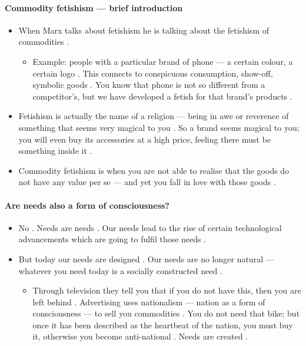 \paragraph{Commodity fetishism --- brief introduction}
\begin{itemize}
    \item When Marx talks about fetishism he is talking about the fetishism of commodities .
    \begin{itemize}
        \item Example: people with a particular brand of phone --- a certain colour, a certain logo . This connects to conspicuous consumption, show-off, symbolic goods . You know that phone is not so different from a competitor's, but we have developed a fetish for that brand's products .
    \end{itemize}
    \item Fetishism is actually the name of a religion --- being in awe or reverence of something that seems very magical to you . So a brand seems magical to you; you will even buy its accessories at a high price, feeling there must be something inside it .
    \item Commodity fetishism is when you are not able to realise that the goods do not have any value per se --- and yet you fall in love with those goods .
\end{itemize}

\paragraph{Are needs also a form of consciousness?}
\begin{itemize}
    \item No . Needs are needs . Our needs lead to the rise of certain technological advancements which are going to fulfil those needs .
    \item But today our needs are designed . Our needs are no longer natural --- whatever you need today is a socially constructed need .
    \begin{itemize}
        \item Through television they tell you that if you do not have this, then you are left behind . Advertising uses nationalism --- nation as a form of consciousness --- to sell you commodities . You do not need that bike; but once it has been described as the heartbeat of the nation, you must buy it, otherwise you become anti-national . Needs are created .
    \end{itemize}
\end{itemize}


